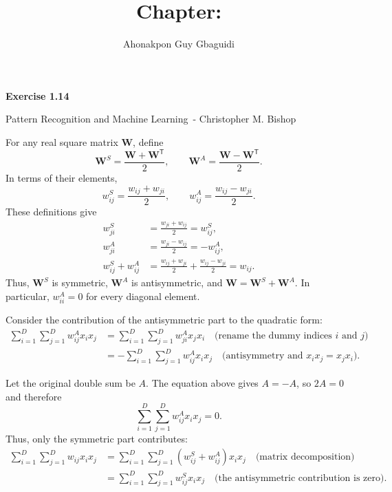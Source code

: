 \documentclass{article}
\title{Chapter: \ChapterName}
\author{Ahonakpon Guy Gbaguidi}
\date{}
\newcommand{\BookName}{Pattern Recognition and Machine Learning}
\newcommand{\BookAuthor}{Christopher M. Bishop}
\newcommand{\ExerciseID}{1.14}
\begin{document}
\maketitle

\begin{center}
  \large\textbf{Exercise \ExerciseID}

  \vspace{0.5em}

  \normalsize\BookName\ - \BookAuthor
\end{center}

\begin{tcolorbox}[breakable,colback=gray!5,colframe=gray!60,title=Solution]
For any real square matrix $\mathbf{W}$, define
\[
\mathbf{W}^{S}=\frac{\mathbf{W}+\mathbf{W}^{\mathsf{T}}}{2},
\qquad
\mathbf{W}^{A}=\frac{\mathbf{W}-\mathbf{W}^{\mathsf{T}}}{2}.
\]
In terms of their elements,
\[
w_{ij}^{S}=\frac{w_{ij}+w_{ji}}{2},
\qquad
w_{ij}^{A}=\frac{w_{ij}-w_{ji}}{2}.
\]
These definitions give
\begin{align*}
w_{ji}^{S}
&=\frac{w_{ji}+w_{ij}}{2}=w_{ij}^{S}, \\
w_{ji}^{A}
&=\frac{w_{ji}-w_{ij}}{2}=-w_{ij}^{A}, \\
w_{ij}^{S}+w_{ij}^{A}
&=\frac{w_{ij}+w_{ji}}{2}+\frac{w_{ij}-w_{ji}}{2}=w_{ij}.
\end{align*}
Thus, $\mathbf{W}^{S}$ is symmetric, $\mathbf{W}^{A}$ is antisymmetric,
and $\mathbf{W}=\mathbf{W}^{S}+\mathbf{W}^{A}$. In particular,
$w_{ii}^{A}=0$ for every diagonal element.

Consider the contribution of the antisymmetric part to the quadratic form:
\begin{align*}
\sum_{i=1}^{D}\sum_{j=1}^{D} w_{ij}^{A}x_i x_j
&= \sum_{i=1}^{D}\sum_{j=1}^{D} w_{ji}^{A}x_j x_i
  \quad \text{(rename the dummy indices $i$ and $j$)} \\
&= -\sum_{i=1}^{D}\sum_{j=1}^{D} w_{ij}^{A}x_i x_j
  \quad \text{(antisymmetry and $x_i x_j=x_j x_i$)}.
\end{align*}

Let the original double sum be $A$. The equation above gives $A=-A$, so
$2A=0$ and therefore
\[
\sum_{i=1}^{D}\sum_{j=1}^{D} w_{ij}^{A}x_i x_j=0.
\]
Thus, only the symmetric part contributes:
\begin{align*}
\sum_{i=1}^{D}\sum_{j=1}^{D} w_{ij}x_i x_j
&= \sum_{i=1}^{D}\sum_{j=1}^{D}
    \left(w_{ij}^{S}+w_{ij}^{A}\right)x_i x_j
  \quad \text{(matrix decomposition)} \\
&= \sum_{i=1}^{D}\sum_{j=1}^{D} w_{ij}^{S}x_i x_j
  \quad \text{(the antisymmetric contribution is zero)}.
\end{align*}


\end{tcolorbox}
\end{document}

